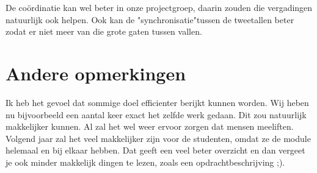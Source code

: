 \documentclass{article}
\begin{document}
\noindent
De coördinatie kan wel beter in onze projectgroep, daarin zouden die vergadingen natuurlijk ook helpen. Ook kan de "synchronisatie"\:tussen de tweetallen beter zodat er niet meer van die grote gaten tussen vallen.

\section*{Andere opmerkingen}
Ik heb het gevoel dat sommige doel efficienter berijkt kunnen worden. Wij heben nu bijvoorbeeld een aantal keer exact het zelfde werk gedaan. Dit zou natuurlijk makkelijker kunnen. Al zal het wel weer ervoor zorgen dat mensen meeliften. Volgend jaar zal het veel makkelijker zijn voor de studenten, omdat ze de module helemaal en bij elkaar hebben. Dat geeft een veel beter overzicht en dan vergeet je ook minder makkelijk dingen te lezen, zoals een opdrachtbeschrijving ;).
\end{document}
